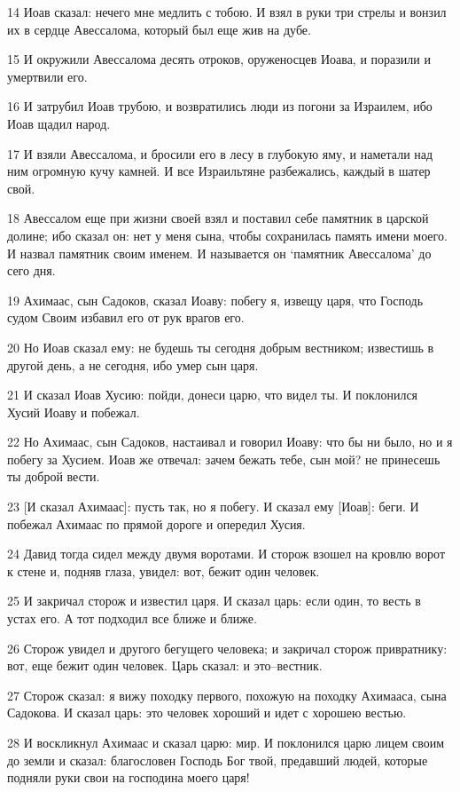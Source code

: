 \par 14 Иоав сказал: нечего мне медлить с тобою. И взял в руки три стрелы и вонзил их в сердце Авессалома, который был еще жив на дубе.
\par 15 И окружили Авессалома десять отроков, оруженосцев Иоава, и поразили и умертвили его.
\par 16 И затрубил Иоав трубою, и возвратились люди из погони за Израилем, ибо Иоав щадил народ.
\par 17 И взяли Авессалома, и бросили его в лесу в глубокую яму, и наметали над ним огромную кучу камней. И все Израильтяне разбежались, каждый в шатер свой.
\par 18 Авессалом еще при жизни своей взял и поставил себе памятник в царской долине; ибо сказал он: нет у меня сына, чтобы сохранилась память имени моего. И назвал памятник своим именем. И называется он `памятник Авессалома' до сего дня.
\par 19 Ахимаас, сын Садоков, сказал Иоаву: побегу я, извещу царя, что Господь судом Своим избавил его от рук врагов его.
\par 20 Но Иоав сказал ему: не будешь ты сегодня добрым вестником; известишь в другой день, а не сегодня, ибо умер сын царя.
\par 21 И сказал Иоав Хусию: пойди, донеси царю, что видел ты. И поклонился Хусий Иоаву и побежал.
\par 22 Но Ахимаас, сын Садоков, настаивал и говорил Иоаву: что бы ни было, но и я побегу за Хусием. Иоав же отвечал: зачем бежать тебе, сын мой? не принесешь ты доброй вести.
\par 23 [И сказал Ахимаас]: пусть так, но я побегу. И сказал ему [Иоав]: беги. И побежал Ахимаас по прямой дороге и опередил Хусия.
\par 24 Давид тогда сидел между двумя воротами. И сторож взошел на кровлю ворот к стене и, подняв глаза, увидел: вот, бежит один человек.
\par 25 И закричал сторож и известил царя. И сказал царь: если один, то весть в устах его. А тот подходил все ближе и ближе.
\par 26 Сторож увидел и другого бегущего человека; и закричал сторож привратнику: вот, еще бежит один человек. Царь сказал: и это--вестник.
\par 27 Сторож сказал: я вижу походку первого, похожую на походку Ахимааса, сына Садокова. И сказал царь: это человек хороший и идет с хорошею вестью.
\par 28 И воскликнул Ахимаас и сказал царю: мир. И поклонился царю лицем своим до земли и сказал: благословен Господь Бог твой, предавший людей, которые подняли руки свои на господина моего царя!
